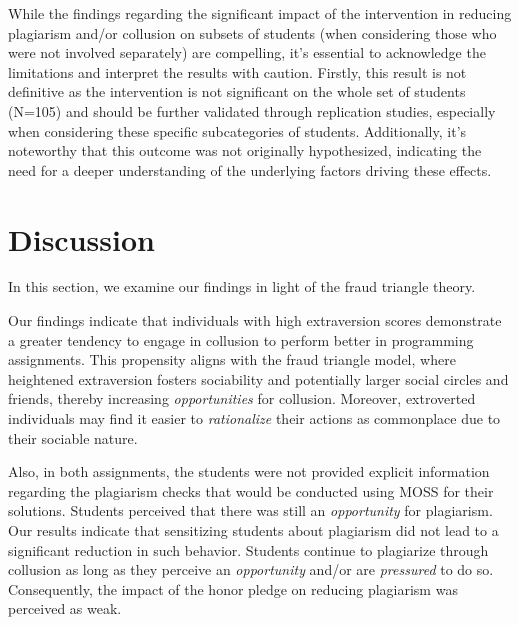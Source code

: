 While the findings regarding the significant impact of the intervention in reducing plagiarism and/or collusion on subsets of students (when considering those who were not involved separately) are compelling, it's essential to acknowledge the limitations and interpret the results with caution. Firstly, this result is not definitive as the intervention is not significant on the whole set of students (N=105) and should be further validated through replication studies, especially when considering these specific subcategories of students. Additionally, it's noteworthy that this outcome was not originally hypothesized, indicating the need for a deeper understanding of the underlying factors driving these effects.

\section{Discussion} \label{sec:discuss}

In this section, we examine our findings in light of the fraud triangle theory.

Our findings indicate that individuals with high extraversion scores demonstrate a greater tendency to engage in collusion to perform better in programming assignments. This propensity aligns with the fraud triangle model, where heightened extraversion fosters sociability and potentially larger social circles and friends, thereby increasing \emph{opportunities} for collusion. Moreover, extroverted individuals may find it easier to \emph{rationalize} their actions as commonplace due to their sociable nature.

Also, in both assignments, the students were not provided explicit information regarding the plagiarism checks that would be conducted using MOSS for their solutions. Students perceived that there was still an \emph{opportunity} for plagiarism. Our results indicate that sensitizing students about plagiarism did not lead to a significant reduction in such behavior. Students continue to plagiarize through collusion as long as they perceive an \textit{opportunity} and/or are \textit{pressured} to do so. Consequently, the impact of the honor pledge on reducing plagiarism was perceived as weak.

